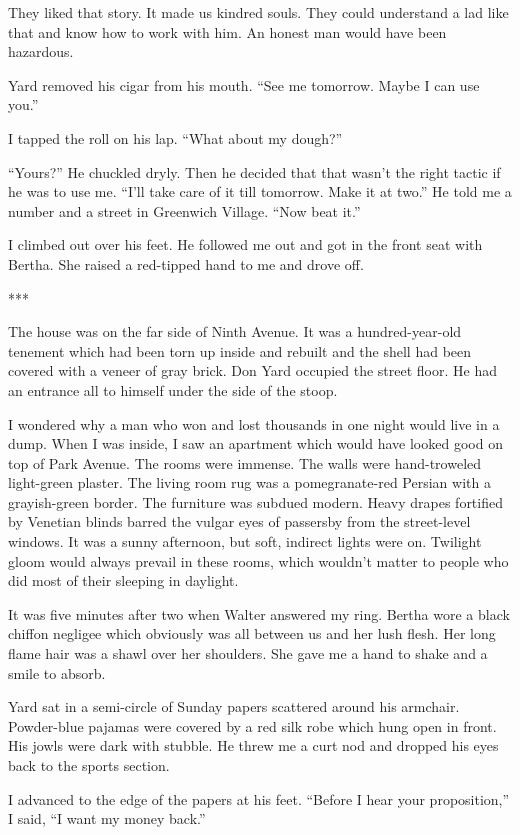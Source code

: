 \documentclass{novel}
\begin{document}
{They liked that story. It made us kindred souls. They could understand a lad like that and know how to work with him. An honest man would have been hazardous.

Yard removed his cigar from his mouth. “See me tomorrow. Maybe I can use you.”

I tapped the roll on his lap. “What about my dough?”

“Yours?” He chuckled dryly. Then he decided that that wasn’t the right tactic if he was to use me. “I’ll take care of it till tomorrow. Make it at two.” He told me a number and a street in Greenwich Village. “Now beat it.”

I climbed out over his feet. He followed me out and got in the front seat with Bertha. She raised a red-tipped hand to me and drove off.

***

The house was on the far side of Ninth Avenue. It was a hundred-year-old tenement which had been torn up inside and rebuilt and the shell had been covered with a veneer of gray brick. Don Yard occupied the street floor. He had an entrance all to himself under the side of the stoop.

I wondered why a man who won and lost thousands in one night would live in a dump. When I was inside, I saw an apartment which would have looked good on top of Park Avenue. The rooms were immense. The walls were hand-troweled light-green plaster. The living room rug was a pomegranate-red Persian with a grayish-green border. The furniture was subdued modern. Heavy drapes fortified by Venetian blinds barred the vulgar eyes of passersby from the street-level windows. It was a sunny afternoon, but soft, indirect lights were on. Twilight gloom would always prevail in these rooms, which wouldn’t matter to people who did most of their sleeping in daylight.

It was five minutes after two when Walter answered my ring. Bertha wore a black chiffon negligee which obviously was all between us and her lush flesh. Her long flame hair was a shawl over her shoulders. She gave me a hand to shake and a smile to absorb.

Yard sat in a semi-circle of Sunday papers scattered around his armchair. Powder-blue pajamas were covered by a red silk robe which hung open in front. His jowls were dark with stubble. He threw me a curt nod and dropped his eyes back to the sports section.

I advanced to the edge of the papers at his feet. “Before I hear your proposition,” I said, “I want my money back.”

}
\end{document}
